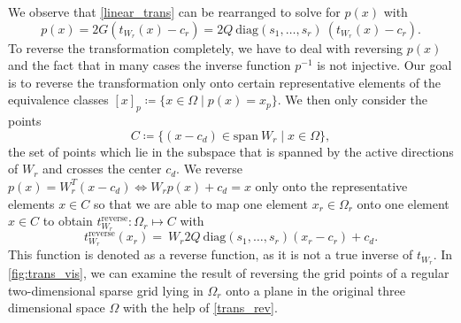 \documentclass[
  a4paper,  %
  twoside,  %
  bibliography=totoc,
  headsepline,
  cleardoublepage=empty,
  parskip=half,
  draft=false
]{scrbook}
\begin{document}
We observe that \cref{linear_trans} can be rearranged to solve for $p(x)$ with
\begin{equation}
p(x)=2 G (t_{W_r}(x) - c_r)=2 Q ~ \text{diag}(s_1, \dots, s_r) ~ (t_{W_r}(x) - c_r).
\label{proj}
\end{equation}
To reverse the transformation completely, we have to deal with reversing $p(x)$ and the fact that in many cases the inverse function $p^{-1}$ is not injective.
Our goal is to reverse the transformation only onto certain representative elements of the equivalence classes $[x]_p \coloneqq \{x \in \Omega \mid p(x)=x_{p}\}$.
We then only consider the points
\begin{equation}
C \coloneqq \{(x - c_d) \in \text{span} ~ W_r \mid x \in \Omega\},
\label{proj_rep}
\end{equation}
\ie the set of points which lie in the subspace that is spanned by the active directions of $W_r$ and crosses the center $c_d$.
We reverse $p(x)=W_r^T (x-c_d) \Leftrightarrow W_r p(x) + c_d = x$ only onto the representative elements $x \in C$ so that we are able to map one element $x_r \in \Omega_r$ onto one element $x \in C$ to obtain $t_{W_r}^{\text{reverse}}\colon \Omega_r \mapsto C$ with
\begin{equation}
t_{W_r}^{\text{reverse}}(x_r) = ~W_r 2 Q ~ \text{diag}\left(s_1, \dots, s_r\right) (x_r - c_r) + c_d.
\label{trans_rev}
\end{equation}
%
This function is denoted as a reverse function, as it is not a true inverse of $t_{W_r}$.
In \cref{fig:trans_vis}, we can examine the result of reversing the grid points of a regular two-dimensional sparse grid lying in $\Omega_r$ onto a plane in the original three dimensional space $\Omega$ with the help of \cref{trans_rev}.
\end{document}
